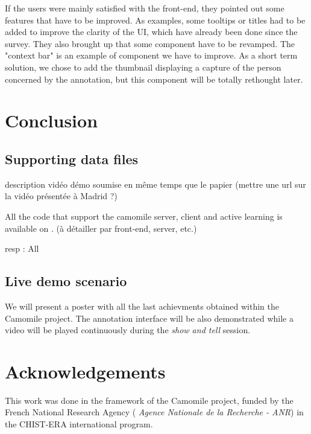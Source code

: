 \documentclass[a4paper]{article}
\begin{document}
If the users were mainly satisfied with the front-end, they pointed out some features that have to be improved. As examples, some tooltips or titles had to be added to improve the clarity of the UI, which have already been done since the survey. They also brought up that some component have to be revamped. The "context bar" is an example of component we have to improve. As a short term solution, we chose to add the thumbnail displaying a capture of the person concerned by the annotation, but this component will be totally rethought later.




  \section{Conclusion}
  
    \subsection{Supporting data files}

description vidéo démo soumise en même temps que le papier
(mettre une url sur la vidéo présentée à Madrid ?)

All the code that support the camomile server, client and active learning is available on \cite{urlcamomile}.
(à détailler par front-end, server, etc.)

resp : All

    \subsection{Live demo scenario}

We will present a poster with all the last achievments obtained within the Camomile project. The annotation interface will be also demonstrated while a video will be played continuously during the \textit{show and tell} session.

        \vspace{-0.3cm}
 \section{Acknowledgements}
  
    This work was done in the framework of the Camomile project, funded by the French National Research Agency ( \textit{Agence Nationale de la Recherche - ANR}) in the CHIST-ERA international program.

  
  \eightpt
  
  
  
\end{document}
